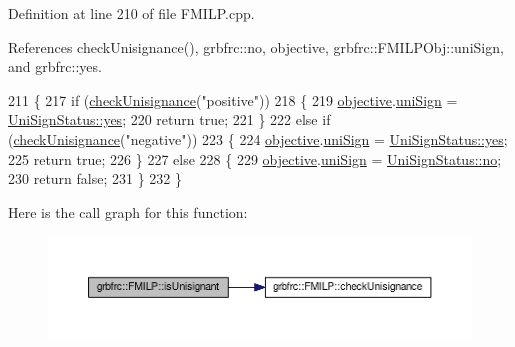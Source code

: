 Definition at line 210 of file F\+M\+I\+L\+P.\+cpp.



References check\+Unisignance(), grbfrc\+::no, objective, grbfrc\+::\+F\+M\+I\+L\+P\+Obj\+::uni\+Sign, and grbfrc\+::yes.


\begin{DoxyCode}
211  \{
217   \textcolor{keywordflow}{if} (\hyperlink{classgrbfrc_1_1FMILP_a1aeef936dc377addedfd5bffcf525213}{checkUnisignance}(\textcolor{stringliteral}{"positive"}))
218    \{
219     \hyperlink{classgrbfrc_1_1FMILP_a8807cc16614684fd6053b44dcd65657c}{objective}.\hyperlink{structgrbfrc_1_1FMILPObj_ab5f06f05e7cb926e59e3f70978f69d5c}{uniSign} = \hyperlink{namespacegrbfrc_a26ee84e31d7fae9e033413a2a5e1f0caaa21c1cd93fb385635c35556848befb75}{UniSignStatus::yes};
220     \textcolor{keywordflow}{return} \textcolor{keyword}{true};
221    \}
222   \textcolor{keywordflow}{else} \textcolor{keywordflow}{if} (\hyperlink{classgrbfrc_1_1FMILP_a1aeef936dc377addedfd5bffcf525213}{checkUnisignance}(\textcolor{stringliteral}{"negative"}))
223    \{
224     \hyperlink{classgrbfrc_1_1FMILP_a8807cc16614684fd6053b44dcd65657c}{objective}.\hyperlink{structgrbfrc_1_1FMILPObj_ab5f06f05e7cb926e59e3f70978f69d5c}{uniSign} = \hyperlink{namespacegrbfrc_a26ee84e31d7fae9e033413a2a5e1f0caaa21c1cd93fb385635c35556848befb75}{UniSignStatus::yes};
225     \textcolor{keywordflow}{return} \textcolor{keyword}{true};
226    \}
227   \textcolor{keywordflow}{else}
228    \{
229     \hyperlink{classgrbfrc_1_1FMILP_a8807cc16614684fd6053b44dcd65657c}{objective}.\hyperlink{structgrbfrc_1_1FMILPObj_ab5f06f05e7cb926e59e3f70978f69d5c}{uniSign} = \hyperlink{namespacegrbfrc_a26ee84e31d7fae9e033413a2a5e1f0caa260830aae0582bc79704895c876ea411}{UniSignStatus::no};
230     \textcolor{keywordflow}{return} \textcolor{keyword}{false};
231    \}
232  \}
\end{DoxyCode}


Here is the call graph for this function\+:
\nopagebreak
\begin{figure}[H]
\begin{center}
\leavevmode
\includegraphics[width=350pt]{classgrbfrc_1_1FMILP_aaf641eb8a257ea33eeaf96a317e74138_cgraph}
\end{center}
\end{figure}


